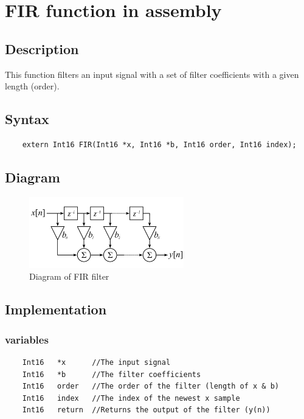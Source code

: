 
\section{FIR function in assembly}


\subsection{Description}
This function filters an input signal with a set of filter coefficients with a given length (order).

\subsection{Syntax} 
\begin{lstlisting}
	extern Int16 FIR(Int16 *x, Int16 *b, Int16 order, Int16 index);
\end{lstlisting}

\subsection{Diagram}
\begin{figure} [h]
	\centering
	\includegraphics[width=0.6\textwidth]{../Journal/Code/FIRfilter}
	\caption{Diagram of FIR filter}
	\label{Fig:FIR_filter}
\end{figure}


\subsection{Implementation}

\subsubsection{variables}
\begin{lstlisting}
	Int16 	*x 		//The input signal
	Int16	*b		//The filter coefficients
	Int16	order	//The order of the filter (length of x & b)
	Int16	index	//The index of the newest x sample
	Int16	return	//Returns the output of the filter (y(n))
\end{lstlisting}

